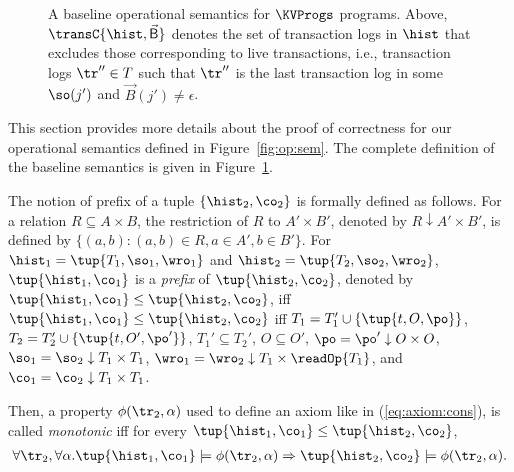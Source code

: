 \begin{figure} [t]
\begin{mathpar}
    
  \end{mathpar}
  \caption{A baseline operational semantics for $\KVProgs$ programs. Above, $\transC{\hist,\vec{\mathsf{B}}}$ denotes the set of transaction logs in $\hist$ that excludes those corresponding to live transactions, i.e., transaction logs $\tr''\in T$ such that $\tr''$ is the last transaction log in some $\so(j')$ and $\vec{B}(j')\neq\epsilon$.}
  \label{fig:op:sem:baseline:complete}
\end{figure}

This section provides more details about the proof of correctness for our operational semantics defined in Figure~\ref{fig:op:sem}. The complete definition of the baseline semantics is given in Figure~\ref{fig:op:sem:baseline:complete}.

The notion of prefix of a tuple $\{\hist_2,\co_2\}$ is formally defined as follows. For a relation $R\subseteq A\times B$, the restriction of $R$ to $A'\times B'$, denoted by $R\downarrow A'\times B'$, is defined by $\{(a,b): (a,b)\in R, a\in A', b\in B'\}$.
For $\hist_1=\tup{T_1, \so_1, \wro_1}$ and $\hist_2=\tup{T_2, \so_2, \wro_2}$, $\tup{\hist_1,\co_1}$ is a \emph{prefix} of $\tup{\hist_2,\co_2}$, denoted by $\tup{\hist_1,\co_1}\leq \tup{\hist_2,\co_2}$, iff $\tup{\hist_1,\co_1}\leq \tup{\hist_2,\co_2}$ iff $T_1=T_1'\cup\{\tup{t,O,\po}\}$, $T_2=T_2'\cup\{\tup{t,O',\po'}\}$, $T_1'\subseteq T_2'$, $O\subseteq O'$, $\po = \po' \downarrow O\times O$, $\so_1 = \so_2 \downarrow T_1\times T_1$, $\wro_1= \wro_2\downarrow T_1\times \readOp{T_1}$, and $\co_1= \co_2\downarrow T_1\times T_1$.

Then, a property $\phi(\tr_2,\alpha)$ used to define an axiom like in (\ref{eq:axiom:cons}), is called \emph{monotonic} iff 
for every  $\tup{\hist_1,\co_1}\leq \tup{\hist_2,\co_2}$, 
\begin{align*}
\forall \tr_2, \forall \alpha. \tup{\hist_1,\co_1}\models \phi(\tr_2,\alpha) \Rightarrow  \tup{\hist_2,\co_2}\models \phi(\tr_2,\alpha).
\end{align*}

